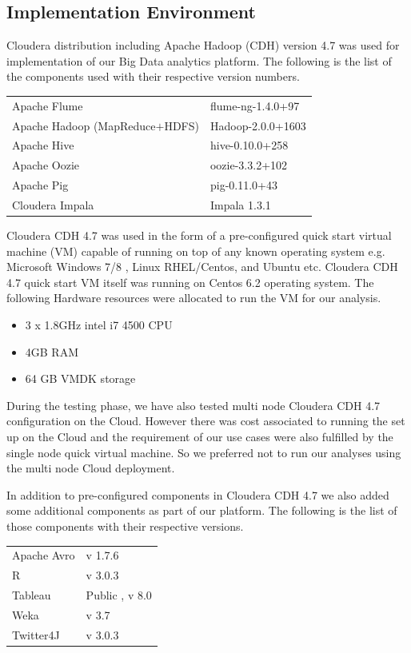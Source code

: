\subsection{Implementation Environment} \label{env}
Cloudera distribution including Apache Hadoop (CDH) version 4.7 was used for implementation of our Big Data analytics platform. The following is the list of the components used with their respective version numbers.  
\begin{longtable}{@{}p{}p{}@{}}
Apache Flume & flume-ng-1.4.0+97 \\
Apache Hadoop (MapReduce\(+\)HDFS) & Hadoop-2.0.0+1603 \\ 
Apache Hive & hive-0.10.0+258 \\ 
Apache Oozie  & oozie-3.3.2+102 \\
Apache Pig & pig-0.11.0+43 \\ 
Cloudera Impala & Impala 1.3.1 
\end{longtable}
Cloudera CDH 4.7 was used in the form of a pre-configured quick start virtual machine (VM) capable of running on top of any known operating system e.g. Microsoft Windows 7/8 , Linux RHEL/Centos, and Ubuntu etc. Cloudera CDH 4.7 quick start VM itself was running on Centos 6.2 operating system. The following Hardware resources were allocated to run the VM for our analysis.
\begin{itemize}
\item 3 x 1.8GHz intel i7 4500 CPU
\item 4GB RAM 
\item 64 GB VMDK storage
\end{itemize}
During the testing phase, we have also tested multi node Cloudera CDH 4.7 configuration on the Cloud. However there was cost associated to running the set up on the Cloud and the requirement of our use cases were also fulfilled by the single node quick virtual machine. So we preferred not to run our analyses using the multi node Cloud deployment.

In addition to pre-configured components in Cloudera CDH 4.7 we also added some additional components as part of our platform. The following is the list of those components with their respective versions.
\begin{longtable}{@{}p{}p{}@{}}
Apache Avro & v 1.7.6 \\
R & v 3.0.3 \\ 
Tableau & Public , v 8.0 \\ 
Weka  & v 3.7 \\
Twitter4J & v 3.0.3 
\end{longtable}

